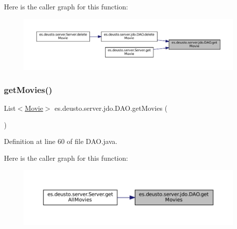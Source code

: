 Here is the caller graph for this function\+:
\nopagebreak
\begin{figure}[H]
\begin{center}
\leavevmode
\includegraphics[width=350pt]{classes_1_1deusto_1_1server_1_1jdo_1_1_d_a_o_a9bbbc5fb0fa218f2feefc3c813edc305_icgraph}
\end{center}
\end{figure}
\mbox{\label{classes_1_1deusto_1_1server_1_1jdo_1_1_d_a_o_a23dfafaa747b95ec24c9df6ca678e7d7}} 
\subsubsection{\texorpdfstring{getMovies()}{getMovies()}}
{\footnotesize\ttfamily List$<$\mbox{\hyperlink{classes_1_1deusto_1_1server_1_1jdo_1_1_movie}{Movie}}$>$ es.\+deusto.\+server.\+jdo.\+D\+A\+O.\+get\+Movies (\begin{DoxyParamCaption}{ }\end{DoxyParamCaption})}



Definition at line 60 of file D\+A\+O.\+java.

Here is the caller graph for this function\+:
\nopagebreak
\begin{figure}[H]
\begin{center}
\leavevmode
\includegraphics[width=350pt]{classes_1_1deusto_1_1server_1_1jdo_1_1_d_a_o_a23dfafaa747b95ec24c9df6ca678e7d7_icgraph}
\end{center}
\end{figure}
\mbox{\label{classes_1_1deusto_1_1server_1_1jdo_1_1_d_a_o_a34f9e5400280bbc1a9fce9143696470e}} 

